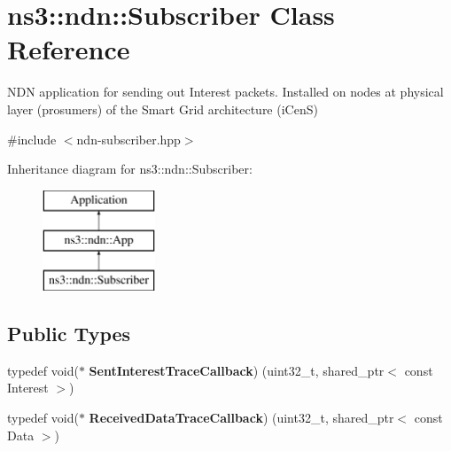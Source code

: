 \hypertarget{classns3_1_1ndn_1_1Subscriber}{}\section{ns3\+:\+:ndn\+:\+:Subscriber Class Reference}
\label{classns3_1_1ndn_1_1Subscriber}


N\+DN application for sending out Interest packets. Installed on nodes at physical layer (prosumers) of the Smart Grid architecture (i\+CenS)  




{\ttfamily \#include $<$ndn-\/subscriber.\+hpp$>$}

Inheritance diagram for ns3\+:\+:ndn\+:\+:Subscriber\+:\begin{figure}[H]
\begin{center}
\leavevmode
\includegraphics[height=3.000000cm]{classns3_1_1ndn_1_1Subscriber}
\end{center}
\end{figure}
\subsection*{Public Types}
\begin{DoxyCompactItemize}
\item 
typedef void($\ast$ {\bfseries Sent\+Interest\+Trace\+Callback}) (uint32\+\_\+t, shared\+\_\+ptr$<$ const Interest $>$)\hypertarget{classns3_1_1ndn_1_1Subscriber_a22726a1cbc00a7731da1d572e0a050ae}{}\label{classns3_1_1ndn_1_1Subscriber_a22726a1cbc00a7731da1d572e0a050ae}

\item 
typedef void($\ast$ {\bfseries Received\+Data\+Trace\+Callback}) (uint32\+\_\+t, shared\+\_\+ptr$<$ const Data $>$)\hypertarget{classns3_1_1ndn_1_1Subscriber_a21c0ce221409431ca0dfed232eaa63d1}{}\label{classns3_1_1ndn_1_1Subscriber_a21c0ce221409431ca0dfed232eaa63d1}

\end{DoxyCompactItemize}
